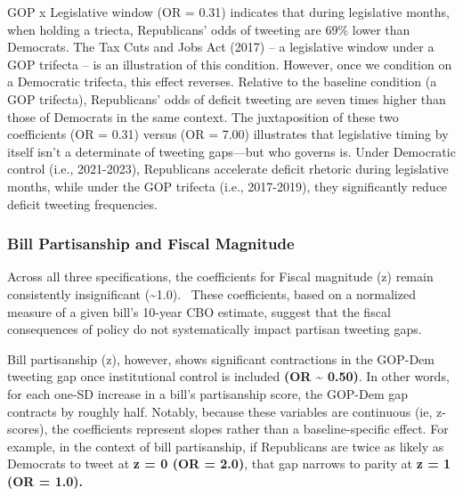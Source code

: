 \documentclass[
]{article}
\begin{document}
GOP x Legislative window (OR = 0.31) indicates that during legislative
months, when holding a triecta, Republicans' odds of tweeting are 69\%
lower than Democrats. The Tax Cuts and Jobs Act (2017) -- a legislative
window under a GOP trifecta -- is an illustration of this condition.
However, once we condition on a Democratic trifecta, this effect
reverses. Relative to the baseline condition (a GOP trifecta),
Republicans' odds of deficit tweeting are seven times higher than those
of Democrats in the same context. The juxtaposition of these two
coeﬀicients (OR = 0.31) versus (OR = 7.00) illustrates that legislative
timing by itself isn't a determinate of tweeting gaps---but who governs
is. Under Democratic control (i.e., 2021-2023), Republicans accelerate
deficit rhetoric during legislative months, while under the GOP trifecta
(i.e., 2017-2019), they significantly reduce deficit tweeting
frequencies.

\subsubsection{Bill Partisanship and Fiscal
Magnitude}\label{sec-bill-partisanship}

Across all three specifications, the coefficients for Fiscal magnitude
(z) remain consistently insignificant (\textasciitilde1.0).~ These
coefficients, based on a normalized measure of a given bill's 10-year
CBO estimate, suggest that the fiscal consequences of policy do not
systematically impact partisan tweeting gaps.

Bill partisanship (z), however, shows significant contractions in the
GOP-Dem tweeting gap once institutional control is included \textbf{(OR
\textasciitilde{} 0.50)}. In other words, for each one-SD increase in a
bill's partisanship score, the GOP-Dem gap contracts by roughly half.
Notably, because these variables are continuous (ie, z-scores), the
coefficients represent slopes rather than a baseline-specific effect.
For example, in the context of bill partisanship, if Republicans are
twice as likely as Democrats to tweet at \textbf{z = 0 (OR = 2.0)}, that
gap narrows to parity at \textbf{z = 1 (OR = 1.0).}

\FloatBarrier
\end{document}
